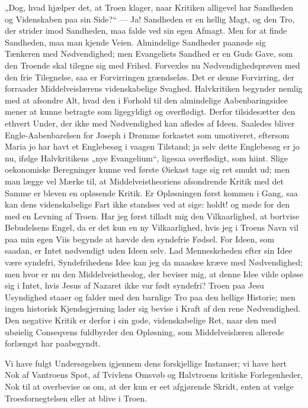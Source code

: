 \documentclass[12pt,a4paper]{book}
\begin{document}
„Dog, hvad hjælper det, at Troen klager, naar Kritiken alligevel har
Sandheden og Videnskaben paa sin Side?“ --- Ja! Sandheden er en hellig Magt,
og den Tro, der strider imod Sandheden, maa falde ved sin egen Afmagt. Men
for at finde Sandheden, maa man kjende Veien. Almindelige Sandheder paanøde
sig Tænkeren med Nødvendighed; men Evangeliets Sandhed er en Guds Gave, som
den Troende skal tilegne sig med Frihed. Forvexles nu Nødvendighedsprøven med
den frie Tilegnelse, saa er Forvirringen grændseløs. Det er denne Forvirring,
der forraader Middelveislærens videnskabelige Svaghed. Halvkritiken begynder
nemlig med at afsondre Alt, hvad den i Forhold til den almindelige
Aabenbaringsidee mener at kunne betragte som ligegyldigt og overflødigt.
Derfor tilsidesætter den ethvert Under, der ikke med Nødvendighed kan afledes
af Ideen. Saaledes bliver Engle-Aabenbarelsen for Joseph i Drømme forkastet
som umotiveret, eftersom Maria jo har havt et Englebesøg i vaagen Tilstand; ja
selv dette Englebesøg er jo nu, ifølge Halvkritikens „nye Evangelium“, ligesaa
overflødigt, som hiint. Slige oekonomiske Beregninger kunne ved første Øiekast
tage sig ret smukt ud; men man lægge vel Mærke til, at Middelveistheoriens
afsondrende Kritik med det Samme er bleven en opløsende Kritik. Er
Opløsningen først kommen i Gang, saa kan dens videnskabelige Fart ikke
standses ved at sige: holdt! og møde for den med en Levning af Troen. Har jeg
først tilladt mig den Vilkaarlighed, at bortvise Bebudelsens Engel, da
er det kun en ny Vilkaarlighed, hvis jeg i Troens Navn vil paa min egen Viis
begynde at hævde den syndefrie Fødsel. For Ideen, som saadan, er Intet
nødvendigt uden Ideen selv. Lad Menneskeheden efter sin Idee være syndefri,
Syndefrihedens Idee kan jeg da maaskee kræve med Nødvendighed; men hvor er nu
den Middelveistheolog, der beviser mig, at denne Idee vilde opløse sig i
Intet, hvis Jesus af Nazaret ikke var født syndefri? Troen paa Jesu
Usyndighed staaer og falder med den barnlige Tro paa den hellige Historie;
men ingen historisk Kjendsgjerning lader sig bevise i Kraft af den rene
Nødvendighed. Den negative Kritik er derfor i sin gode, videnskabelige Ret,
naar den med ubøielig Conseqvens fuldbyrder den Opløsning, som
Middelveislæren allerede forlængst har paabegyndt.

Vi have fulgt Undersøgelsen igjennem dens forskjellige Instanser; vi have
hørt Nok af Vantroens Spot, af Tvivlens Omsvøb og Halvtroens kritiske
Forlegenheder, Nok til at overbevise os om, at der kun er eet afgjørende
Skridt, enten at vælge Troesfornegtelsen eller at blive i Troen.
\end{document}
